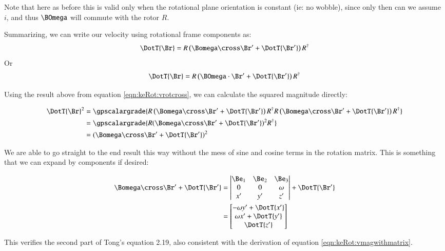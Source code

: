 Note that here as before this is valid only when the rotational plane orientation is constant (ie: no wobble), since only then can we assume $i$, and thus $\BOmega$ will commute with the rotor $R$.

Summarizing, we can write our velocity using rotational frame components
as: 
\begin{equation}\label{eqn:keRot:vrotcross}
\DotT{\Br} = {R} \left( \Bomega \cross \Br' + \DotT{\Br'} \right) R^\dagger
\end{equation}
Or
\begin{equation}
\DotT{\Br} = {R} \left( \BOmega \cdot \Br' + \DotT{\Br'} \right) R^\dagger
\end{equation}

Using the result above from equation \ref{eqn:keRot:vrotcross}, we can calculate
the squared magnitude directly:

\begin{align*}
\DotT{\Br} ^2 
&= \gpscalargrade{ 
{R} \left( \Bomega \cross \Br' + \DotT{\Br'} \right) R^\dagger
{R} \left( \Bomega \cross \Br' + \DotT{\Br'} \right) R^\dagger
} \\
&= \gpscalargrade{ 
{R} ( \Bomega \cross \Br' + \DotT{\Br'} ) ^2 R^\dagger
} \\
&= ( \Bomega \cross \Br' + \DotT{\Br'} ) ^2 \\
\end{align*}

We are able to go straight to the end result this way without the mess
of sine and cosine terms in the rotation matrix.  This is something that
we can expand by components if desired:

\begin{align*}
\Bomega \cross \Br' + \DotT{\Br'}
&= 
\begin{vmatrix}
\Be_1 & \Be_2 & \Be_3 \\
0 & 0 & \omega \\
x' & y' & z' \\
\end{vmatrix}
+ \DotT{\Br'} \\
&=
\begin{bmatrix}
-\omega y' + \DotT{x'} \\
\omega x' + \DotT{y'} \\
 \DotT{z'} \\
\end{bmatrix}
\end{align*}

This verifies the second part of Tong's equation 2.19, also consistent with the
derivation of equation \ref{eqn:keRot:vmagwithmatrix}.

